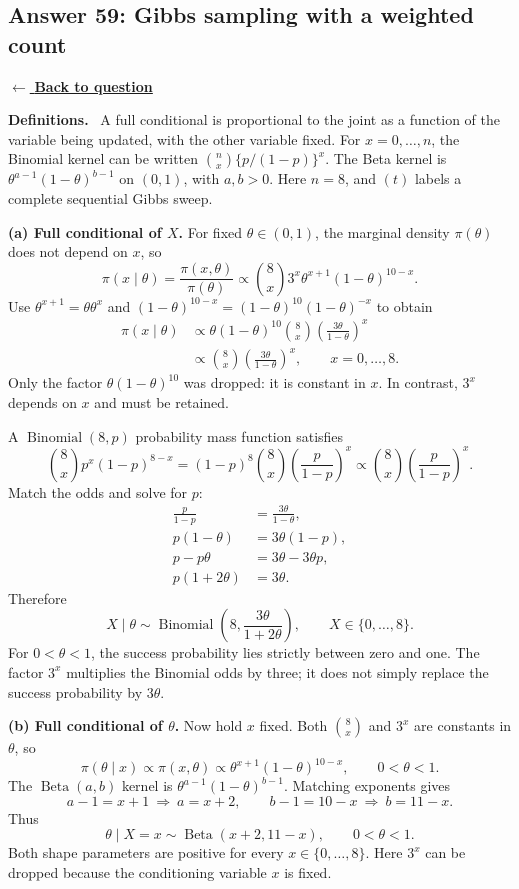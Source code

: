 \documentclass[11pt,a4paper]{article}
\newcommand{\given}{\mathrel{|}}
\newcommand{\answernav}[1]{%
  \label{answer:#1}%
  \noindent\hyperref[question:#1]{$\leftarrow$ \textbf{Back to question}}%
  \par\smallskip}
\newcommand{\studyheading}[1]{%
  \par\medskip\noindent\textcolor{statblue}{\textbf{#1.}}\ }
\begin{document}
\clearpage

\subsection{Answer 59: Gibbs sampling with a weighted count}
\answernav{59}

\studyheading{Definitions}
A full conditional is proportional to the joint as a function of the variable being updated, with the other variable fixed.
For $x=0,\ldots,n$, the Binomial kernel can be written
$\binom nx\{p/(1-p)\}^x$.
The Beta kernel is $\theta^{a-1}(1-\theta)^{b-1}$ on $(0,1)$, with $a,b>0$.
Here $n=8$, and $(t)$ labels a complete sequential Gibbs sweep.

\textbf{(a) Full conditional of $X$.}
For fixed $\theta\in(0,1)$, the marginal density $\pi(\theta)$ does not
depend on $x$, so
\[
\pi(x\given\theta)=\frac{\pi(x,\theta)}{\pi(\theta)}
\propto\binom8x3^x\theta^{x+1}(1-\theta)^{10-x}.
\]
Use $\theta^{x+1}=\theta\theta^x$ and
$(1-\theta)^{10-x}=(1-\theta)^{10}(1-\theta)^{-x}$ to obtain
\[
\begin{aligned}
\pi(x\given\theta)
&\propto\theta(1-\theta)^{10}\binom8x
 \left(\frac{3\theta}{1-\theta}\right)^x\\
&\propto\binom8x\left(\frac{3\theta}{1-\theta}\right)^x,
\qquad x=0,\ldots,8.
\end{aligned}
\]
Only the factor $\theta(1-\theta)^{10}$ was dropped: it is constant in $x$.
In contrast, $3^x$ depends on $x$ and must be retained.

A $\operatorname{Binomial}(8,p)$ probability mass function satisfies
\[
\binom8x p^x(1-p)^{8-x}
=(1-p)^8\binom8x\left(\frac p{1-p}\right)^x
\propto\binom8x\left(\frac p{1-p}\right)^x.
\]
Match the odds and solve for $p$:
\[
\begin{aligned}
\frac p{1-p}&=\frac{3\theta}{1-\theta},\\
p(1-\theta)&=3\theta(1-p),\\
p-p\theta&=3\theta-3\theta p,\\
p(1+2\theta)&=3\theta.
\end{aligned}
\]
Therefore
\[
\boxed{X\given\theta\sim
\operatorname{Binomial}\!\left(8,\frac{3\theta}{1+2\theta}\right),
\qquad X\in\{0,\ldots,8\}.}
\]
For $0<\theta<1$, the success probability lies strictly between zero and
one. The factor $3^x$ multiplies the Binomial odds by three; it does not
simply replace the success probability by $3\theta$.

\textbf{(b) Full conditional of $\theta$.}
Now hold $x$ fixed. Both $\binom8x$ and $3^x$ are constants in $\theta$,
so
\[
\pi(\theta\given x)\propto\pi(x,\theta)
\propto\theta^{x+1}(1-\theta)^{10-x},\qquad0<\theta<1.
\]
The $\operatorname{Beta}(a,b)$ kernel is
$\theta^{a-1}(1-\theta)^{b-1}$. Matching exponents gives
\[
a-1=x+1\ \Longrightarrow\ a=x+2,\qquad
b-1=10-x\ \Longrightarrow\ b=11-x.
\]
Thus
\[
\boxed{\theta\given X=x\sim\operatorname{Beta}(x+2,11-x),
\qquad0<\theta<1.}
\]
Both shape parameters are positive for every $x\in\{0,\ldots,8\}$.
Here $3^x$ can be dropped because the conditioning variable $x$ is fixed.
\end{document}
